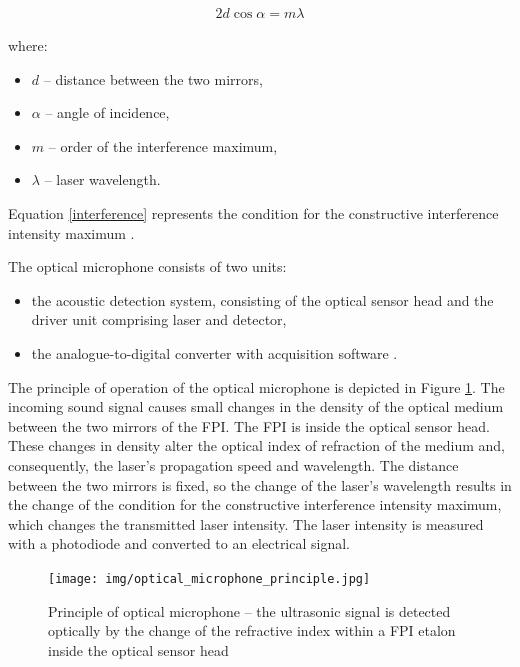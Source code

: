 \begin{gather} \label{interference}
2d\cos\alpha = m\lambda
\end{gather} 

where:

\begin{itemize}

    \item $d$ -- distance between the two mirrors,
    \item $\alpha$ -- angle of incidence,
    \item $m$ -- order of the interference maximum,
    \item $\lambda$ -- laser wavelength.
    
\end{itemize}

Equation \ref{interference} represents the condition for the constructive interference intensity maximum \cite{fpi}.

 The optical microphone consists of two units:

\begin{itemize}
 
    \item the acoustic detection system, consisting of the optical sensor head and the driver unit comprising laser and detector,

    \item the analogue-to-digital converter with acquisition software \cite{fischer_rohringer_panzer_hecker_2017}.

\end{itemize}

 The principle of operation of the optical microphone is depicted in Figure \ref{fig:optical_microphone_principle}. The incoming sound signal causes small changes in the density of the optical medium between the two mirrors of the FPI. The FPI is inside the optical sensor head. These changes in density alter the optical index of refraction of the medium and, consequently, the laser’s propagation speed and wavelength. The distance between the two mirrors is fixed, so the change of the laser’s wavelength results in the change of the condition for the constructive interference intensity maximum, which changes the transmitted laser intensity. The laser intensity is measured with a photodiode and converted to an electrical signal.

\begin{figure}[h]
    \centering
    \texttt{[image: img/optical\_microphone\_principle.jpg]}
    \caption{Principle of optical microphone -- the ultrasonic signal is detected optically by the change of the refractive index within a FPI etalon inside the optical sensor head \cite{fischer_rohringer_panzer_hecker_2017}}
    \label{fig:optical_microphone_principle}
\end{figure}

